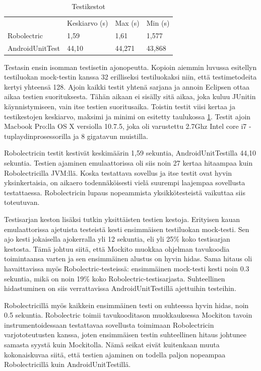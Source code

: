 \begin{table}[h]
\centering
\begin{tabular}{ l l l l }
   & Keskiarvo (s) & Max (s) & Min (s) \\
  Robolectric & 1,59 & 1,61 & 1,577 \\
  AndroidUnitTest & 44,10 & 44,271 & 43,868 \\
\end{tabular}
\caption{Testikestot}
\label{unittest_timing}
\end{table}

Testasin ensin isomman testisetin ajonopeutta. Kopioin aiemmin luvussa esitellyn testiluokan mock-testin kanssa 32 erilliseksi testiluokaksi niin, että testimetodeita kertyi yhteensä 128. Ajoin kaikki testit yhtenä sarjana ja annoin Eclipsen ottaa aikaa testien suorituksesta. Tähän aikaan ei sisälly sitä aikaa, joka kuluu JUnitin käynnistymiseen, vain itse testien suoritusaika. Toistin testit viisi kertaa ja testikestojen keskiarvo, maksimi ja minimi on esitetty taulukossa \ref{unittest_timing}. Testit ajoin Macbook Pro:lla OS X versiolla 10.7.5, joka oli varustettu 2.7Ghz Intel core i7 -tuplaydinprosessorilla ja 8 gigatavun muistilla.

Robolectricin testit kestivät keskimäärin 1,59 sekuntia, AndroidUnitTestilla 44,10 sekuntia. Testien ajaminen emulaattorissa oli siis noin 27 kertaa hitaampaa kuin Robolectricilla JVM:llä. Koska testattava sovellus ja itse testit ovat hyvin yksinkertaisia, on aikaero todennäköisesti vielä suurempi laajempaa sovellusta testattaessa. Robolectricin lupaus nopeammista yksikkötesteistä vaikuttaa siis toteutuvan.

Testisarjan keston lisäksi tutkin yksittäisten testien kestoja. Erityisen kauan emulaattorissa ajetuista testeistä kesti ensimmäisen testiluokan mock-testi. Sen ajo kesti jokaisella ajokerralla yli 12 sekuntia, eli yli 25\% koko testisarjan kestosta. Tämä johtuu siitä, että Mockito muokkaa ohjelman tavukoodia toimintaansa varten ja sen ensimmäinen alustus on hyvin hidas. Sama hitaus oli havaittavissa myös Robolectric-testeissä: ensimmäinen mock-testi kesti noin 0.3 sekuntia, mikä on noin 19\% koko Robolectric-testisarjasta. Suhteellinen hidastuminen on siis verrattavissa AndroidUnitTestillä ajettuihin testeihin.

Robolectricillä myös kaikkein ensimmäinen testi on suhteessa hyvin hidas, noin 0.5 sekuntia. Robolectric toimii tavukooditason muokkauksessa Mockiton tavoin instrumentoidessaan testattavaa sovellusta toimimaan Robolectricin varjototeutusten kanssa, joten ensimmäisen testin suhteellinen hitaus johtunee samasta syystä kuin Mockitolla.
Nämä seikat eivät kuitenkaan muuta kokonaiskuvaa siitä, että testien ajaminen on todella paljon nopeampaa Robolectricillä kuin AndroidUnitTestillä.

